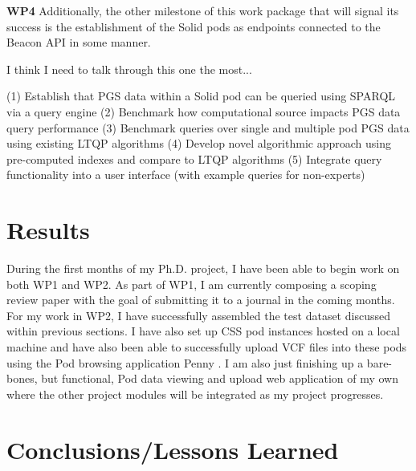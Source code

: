 \documentclass[runningheads]{llncs}
\begin{document}
\textbf{WP4}
Additionally, the other milestone of this work package that will signal its success is the establishment of the Solid pods as endpoints connected to the Beacon API in some manner. 

I think I need to talk through this one the most... 

(1) Establish that PGS data within a Solid pod can be queried using SPARQL via a query engine
(2) Benchmark how computational source impacts PGS data query performance
(3) Benchmark queries over single and multiple pod PGS data using existing LTQP algorithms
(4) Develop novel algorithmic approach using pre-computed indexes and compare to LTQP algorithms
(5) Integrate query functionality into a user interface (with example queries for non-experts)


\section{Results}

During the first months of my Ph.D. project, I have been able to begin work on both WP1 and WP2. 
As part of WP1, I am currently composing a scoping review paper with the goal of submitting it to a journal in the coming months.
For my work in WP2, I have successfully assembled the test dataset discussed within previous sections.
I have also set up CSS pod instances hosted on a local machine and have also been able to successfully upload VCF files into these pods using the Pod browsing application Penny \cite{penny}. 
I am also just finishing up a bare-bones, but functional, Pod data viewing and upload web application of my own where the other project modules will be integrated as my project progresses.


\section{Conclusions/Lessons Learned}

\end{document}
